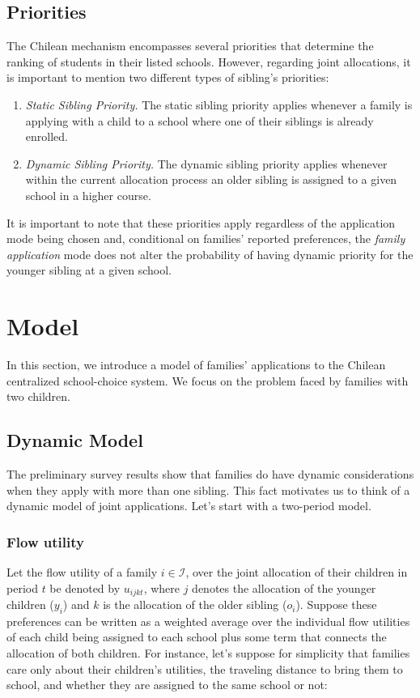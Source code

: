 \documentclass{article}
\begin{document}
\subsection{Priorities}
The Chilean mechanism encompasses several priorities that determine the ranking of students in their listed schools. However, regarding joint allocations, it is important to mention two different types of sibling's priorities:

\begin{enumerate}
    \item \textit{Static Sibling Priority.} The static sibling priority applies whenever a family is applying with a child to a school where one of their siblings is already enrolled. 
    \item \textit{Dynamic Sibling Priority.} The dynamic sibling priority applies whenever within the current allocation process an older sibling is assigned to a given school in a higher course.
\end{enumerate}

It is important to note that these priorities apply regardless of the application mode being chosen and, conditional on families' reported preferences, the \textit{family application} mode does not alter the probability of having dynamic priority for the younger sibling at a given school. 


\section{Model}\label{sec:model}

In this section, we introduce a model of families' applications to the Chilean centralized school-choice system. We focus on the problem faced by families with two children.


\subsection{Dynamic Model}

The preliminary survey results show that families do have dynamic considerations when they apply with more than one sibling. This fact motivates us to think of a dynamic model of joint applications. Let's start with a two-period model. 

\subsubsection{Flow utility}
Let the flow utility of a family $i \in \mathcal{I}$, over the joint allocation of their children in period $t$ be denoted by $u_{ijkt}$, where $j$ denotes the allocation of the younger children ($y_i$) and $k$ is the allocation of the older sibling ($o_i$). Suppose these preferences can be written as a weighted average over the individual flow utilities of each child being assigned to each school plus some term that connects the allocation of both children. For instance, let's suppose for simplicity that families care only about their children's utilities, the traveling distance to bring them to school, and whether they are assigned to the same school or not:
\end{document}
